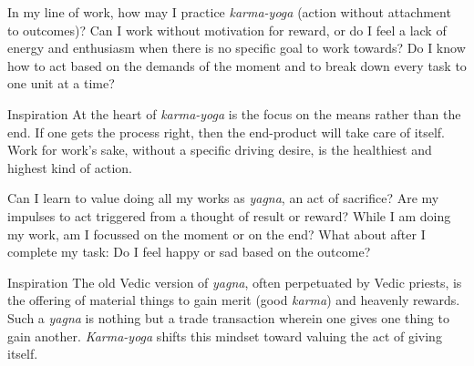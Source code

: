
\newpage
\begin{mananam}{} 
\mananamtext In my line of work, how may I practice \emph{karma-yoga} (action without attachment to outcomes)? Can I work without motivation for reward, or do I feel a lack of energy and enthusiasm when there is no specific goal to work towards? Do I know how to act based on the demands of the moment and to break down every task to one unit at a time?
\end{mananam}
\WritingHand{}
\begin{inspiration}{\mananamfont Inspiration}
\mananamtext At the heart of \emph{karma-yoga} is the focus on the means rather than the end. If one gets the process right, then the end-product will take care of itself. Work for work’s sake, without a specific driving desire, is the healthiest and highest kind of action.
\end{inspiration}
\newpage

\newpage
\begin{mananam}{} 
\mananamtext Can I learn to value doing all my works as \emph{yagna}, an act of sacrifice? Are my impulses to act triggered from a thought of result or reward? While I am doing my work, am I focussed on the moment or on the end? What about after I complete my task: Do I feel happy or sad based on the outcome?
\end{mananam}
\WritingHand{}
\begin{inspiration}{\mananamfont Inspiration}
\mananamtext The old Vedic version of \emph{yagna}, often perpetuated by Vedic priests, is the offering of material things to gain merit (good \emph{karma}) and heavenly rewards. Such a \emph{yagna} is nothing but a trade transaction wherein one gives one thing to gain another. \emph{Karma-yoga} shifts this mindset toward valuing the act of giving itself.
\end{inspiration}
\newpage

